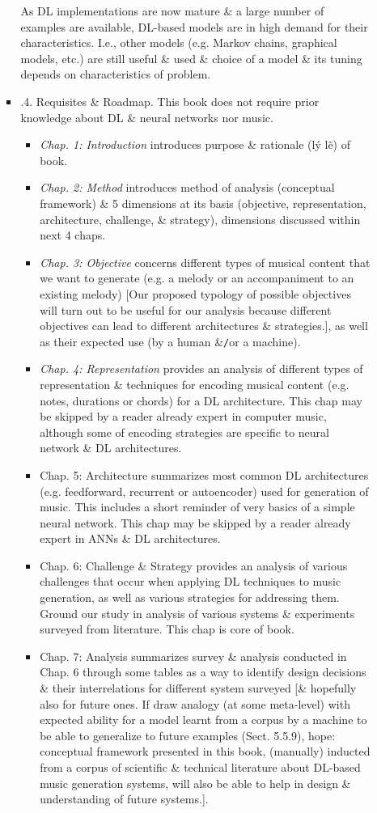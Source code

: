 \documentclass{article}
\begin{document}
\begin{itemize}
\begin{itemize}
\begin{itemize}
\begin{itemize}
			\end{itemize}
			As DL implementations are now mature \& a large number of examples are available, DL-based models are in high demand for their characteristics. I.e., other models (e.g. Markov chains, graphical models, etc.) are still useful \& used \& choice of a model \& its tuning depends on characteristics of problem.
			\item {.4. Requisites \& Roadmap.} This book does not require prior knowledge about DL \& neural networks nor music.
			\begin{itemize}
				\item {\it Chap. 1: Introduction} introduces purpose \& rationale (lý lẽ) of book.
				\item {\it Chap. 2: Method} introduces method of analysis (conceptual framework) \& 5 dimensions at its basis (objective, representation, architecture, challenge, \& strategy), dimensions discussed within next 4 chaps.
				\item {\it Chap. 3: Objective} concerns different types of musical content that we want to generate (e.g. a melody or an accompaniment to an existing melody) [Our proposed typology of possible objectives will turn out to be useful for our analysis because different objectives can lead to different architectures \& strategies.], as well as their expected use (by a human \&{\tt/}or a machine).
				\item {\it Chap. 4: Representation} provides an analysis of different types of representation \& techniques for encoding musical content (e.g. notes, durations or chords) for a DL architecture. This chap may be skipped by a reader already expert in computer music, although some of encoding strategies are specific to neural network \& DL architectures.
				\item {\sf Chap. 5: Architecture} summarizes most common DL architectures (e.g. feedforward, recurrent or autoencoder) used for generation of music. This includes a short reminder of very basics of a simple neural network. This chap may be skipped by a reader already expert in ANNs \& DL architectures.
				\item {\sf Chap. 6: Challenge \& Strategy} provides an analysis of various challenges that occur when applying DL techniques to music generation, as well as various strategies for addressing them. Ground our study in analysis of various systems \& experiments surveyed from literature. This chap is core of book.
				\item {\sf Chap. 7: Analysis} summarizes survey \& analysis conducted in Chap. 6 through some tables as a way to identify design decisions \& their interrelations for different system surveyed [\& hopefully also for future ones. If draw analogy (at some meta-level) with expected ability for a model learnt from a corpus by a machine to be able to generalize to future examples (Sect. 5.5.9), hope: conceptual framework presented in this book, (manually) inducted from a corpus of scientific \& technical literature about DL-based music generation systems, will also be able to help in design \& understanding of future systems.].

\end{itemize}
\end{itemize}
\end{itemize}
\end{itemize}
\end{document}
